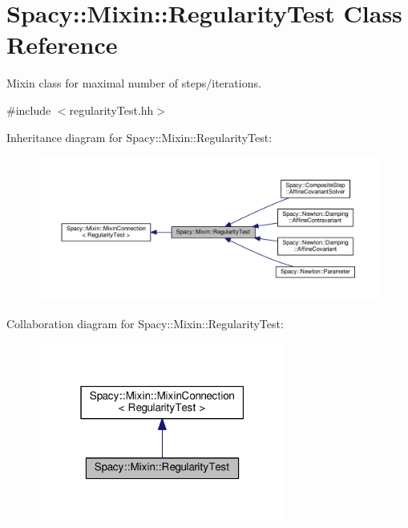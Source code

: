 \hypertarget{classSpacy_1_1Mixin_1_1RegularityTest}{}\section{Spacy\+:\+:Mixin\+:\+:Regularity\+Test Class Reference}
\label{classSpacy_1_1Mixin_1_1RegularityTest}


Mixin class for maximal number of steps/iterations.  




{\ttfamily \#include $<$regularity\+Test.\+hh$>$}



Inheritance diagram for Spacy\+:\+:Mixin\+:\+:Regularity\+Test\+:\nopagebreak
\begin{figure}[H]
\begin{center}
\leavevmode
\includegraphics[width=350pt]{classSpacy_1_1Mixin_1_1RegularityTest__inherit__graph}
\end{center}
\end{figure}


Collaboration diagram for Spacy\+:\+:Mixin\+:\+:Regularity\+Test\+:\nopagebreak
\begin{figure}[H]
\begin{center}
\leavevmode
\includegraphics[width=232pt]{classSpacy_1_1Mixin_1_1RegularityTest__coll__graph}
\end{center}
\end{figure}
